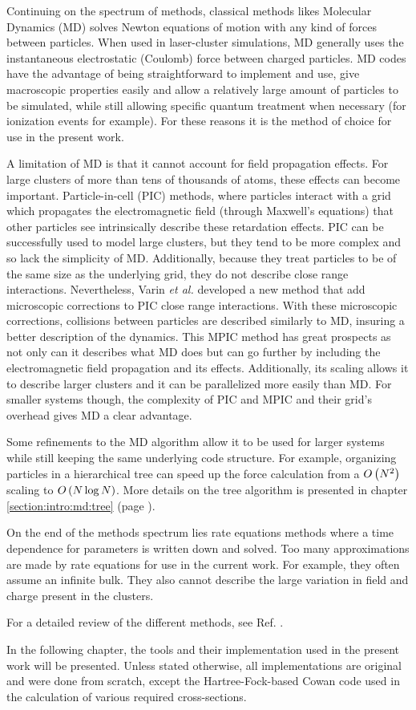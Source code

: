 Continuing on the spectrum of methods, classical methods likes Molecular
Dynamics (MD) solves Newton
equations of motion with any kind of forces between particles\cite{Skeel1998}.
When used in
laser-cluster simulations, MD generally uses the instantaneous electrostatic
(Coulomb) force between charged particles. MD codes have the advantage of being
straightforward to implement and use, give macroscopic properties easily and allow a
relatively large amount of particles to be simulated, while still allowing
specific quantum treatment when necessary (for ionization events for example). For
these reasons it is the method of choice for use in the present work.

A limitation of MD is that it cannot account for field propagation effects. For
large clusters of more than tens of thousands of atoms, these effects can become
important. Particle-in-cell (PIC) methods, where particles interact with a grid which propagates the
electromagnetic field (through Maxwell's equations) that other particles see
intrinsically describe these retardation effects. PIC can be successfully used
to model large clusters, but they tend to be more complex and so lack the
simplicity of MD. Additionally, because they treat particles to be of the same
size as the underlying grid, they do not describe close range interactions.
Nevertheless, Varin \textit{et al.} developed a new method that add microscopic
corrections to PIC close range interactions\cite{Varin2012}. With these microscopic
corrections, collisions between particles are described similarly to MD, insuring
a better description of the dynamics. This MPIC method has great prospects
as not only can it describes what MD does but can go further by including the
electromagnetic field propagation and its effects. Additionally, its scaling
allows it to describe larger clusters and it can be parallelized more easily
than MD. For smaller systems though, the complexity of PIC and MPIC and their
grid's overhead gives MD a clear advantage.

Some refinements to the MD algorithm allow it to be used for larger systems
while still keeping the same underlying code structure. For example, organizing
particles in a hierarchical tree\cite{Barnes1986,Gibbon2002} can speed up the force
calculation from a $O\left( N^2 \right)$ scaling to $O\left( N \log{N} \right)$. More details on the
tree algorithm is presented in chapter \ref{section:intro:md:tree} (page
\pageref{section:intro:md:tree}).

On the end of the methods spectrum lies rate equations methods where a time
dependence for parameters is written down and solved. Too many approximations
are made by rate equations for use in the current work. For example, they often
assume an infinite bulk. They also cannot describe the large variation in field
and charge present in the clusters.

For a detailed review of the different methods, see Ref. \cite{Fennel2010}.

In the following chapter, the tools and their implementation used in the present
work will be presented. Unless stated otherwise, all implementations are original
and were done from scratch, except the Hartree-Fock-based Cowan code\cite{CowanCode} used
in the calculation of various required cross-sections.


